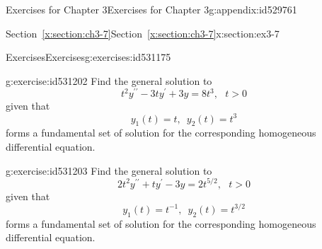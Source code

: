 \documentclass[oneside,10pt,]{book}
\newcommand{\xreffont}{\relax}
\numberwithin{equation}{section}
\numberwithin{equation}{section}
\begin{document}
\begin{appendixptx}{Exercises for Chapter 3}{}{Exercises for Chapter 3}{}{}{g:appendix:id529761}
\begin{sectionptx}{Section~{\xreffont\ref*{x:section:ch3-7}}}{}{Section~{\xreffont\ref*{x:section:ch3-7}}}{}{}{x:section:ex3-7}
\begin{exercises-subsection-numberless}{Exercises}{}{Exercises}{}{}{g:exercises:id531175}
\begin{divisionexercise}{3}{}{}{g:exercise:id531202}
Find the general solution to%
\begin{equation*}
t^{2}y^{\prime\prime}-3ty^{\prime}+3y=8t^{3},\,\,\,\,t>0
\end{equation*}
given that%
\begin{equation*}
y_{1}(t)=t,\,\,\,y_{2}(t)=t^{3}
\end{equation*}
forms a fundamental set of solution for the corresponding homogeneous differential equation.%
\end{divisionexercise}%
\begin{divisionexercise}{4}{}{}{g:exercise:id531203}%
Find the general solution to%
\begin{equation*}
2t^{2}y^{\prime\prime}+ty^{\prime}-3y=2t^{5/2},\,\,\,\,t>0
\end{equation*}
given that%
\begin{equation*}
y_{1}(t)=t^{-1},\,\,\,y_{2}(t)=t^{3/2}
\end{equation*}
forms a fundamental set of solution for the corresponding homogeneous differential equation.%
\end{divisionexercise}%
\end{exercises-subsection-numberless}
\end{sectionptx}
\end{appendixptx}
%
%
\typeout{************************************************}
\typeout{************************************************}
%
\end{document}
